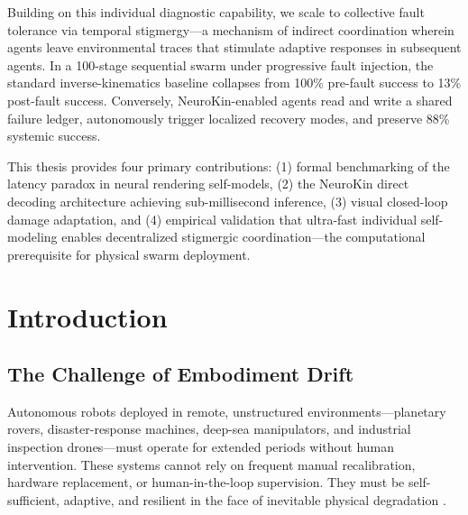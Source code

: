 ﻿\documentclass[12pt,a4paper,oneside]{report}
\begin{document}
Building on this individual diagnostic capability, we scale to collective fault tolerance via temporal stigmergy---a mechanism of indirect coordination wherein agents leave environmental traces that stimulate adaptive responses in subsequent agents. In a 100-stage sequential swarm under progressive fault injection, the standard inverse-kinematics baseline collapses from 100\% pre-fault success to 13\% post-fault success. Conversely, NeuroKin-enabled agents read and write a shared failure ledger, autonomously trigger localized recovery modes, and preserve 88\% systemic success.

This thesis provides four primary contributions: (1) formal benchmarking of the latency paradox in neural rendering self-models, (2) the NeuroKin direct decoding architecture achieving sub-millisecond inference, (3) visual closed-loop damage adaptation, and (4) empirical validation that ultra-fast individual self-modeling enables decentralized stigmergic coordination---the computational prerequisite for physical swarm deployment.

\clearpage

\tableofcontents
\clearpage
\listoffigures
{}
\clearpage
\listoftables
{}
\clearpage


\chapter{Introduction}

\section{The Challenge of Embodiment Drift}

Autonomous robots deployed in remote, unstructured environments---planetary rovers, disaster-response machines, deep-sea manipulators, and industrial inspection drones---must operate for extended periods without human intervention. These systems cannot rely on frequent manual recalibration, hardware replacement, or human-in-the-loop supervision. They must be self-sufficient, adaptive, and resilient in the face of inevitable physical degradation \cite{bongard2006resilient, cully2015robots}.
\end{document}
